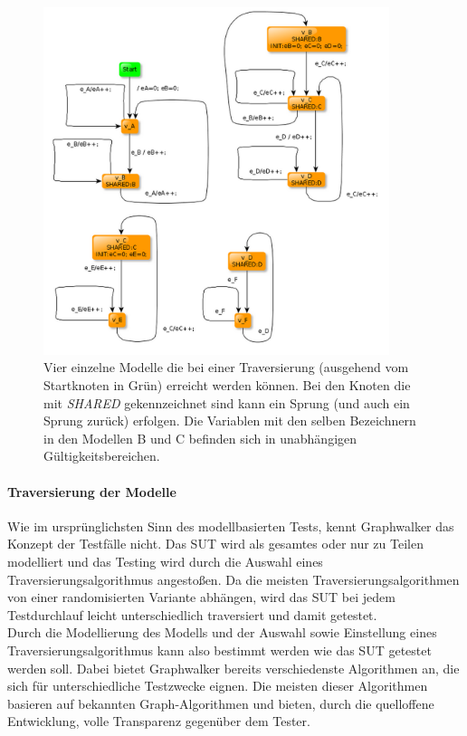 \begin{figure}[h] 
  \centering
     \includegraphics[width=0.9\textwidth]{figures/gw_multiple_models.png}
  \caption{Vier einzelne Modelle die bei einer Traversierung (ausgehend vom Startknoten in Grün) erreicht werden können. Bei den Knoten die mit \textit{SHARED} gekennzeichnet sind kann ein Sprung (und auch ein Sprung zurück) erfolgen. Die Variablen mit den selben Bezeichnern in den Modellen B und C befinden sich in unabhängigen Gültigkeitsbereichen.\cite{_graphwalker_2015}}
  \label{fig:gw_multiple_models}
\end{figure}

\paragraph{Traversierung der Modelle}  
Wie im ursprünglichsten Sinn des modellbasierten Tests, kennt Graphwalker das Konzept der Testfälle nicht. Das SUT wird als gesamtes oder nur zu Teilen modelliert und das Testing wird durch die Auswahl eines Traversierungsalgorithmus angestoßen. Da die meisten Traversierungsalgorithmen von einer randomisierten Variante abhängen, wird das SUT bei jedem Testdurchlauf leicht unterschiedlich traversiert und damit getestet.\\
Durch die Modellierung des Modells und der Auswahl sowie Einstellung eines Traversierungsalgorithmus kann also bestimmt werden wie das SUT getestet werden soll. Dabei bietet Graphwalker bereits verschiedenste Algorithmen an, die sich für unterschiedliche Testzwecke eignen. Die meisten dieser Algorithmen basieren auf bekannten Graph-Algorithmen und bieten, durch die quelloffene Entwicklung, volle Transparenz gegenüber dem Tester.

